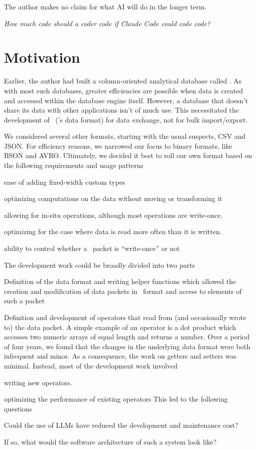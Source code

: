 \documentclass[letterpaper,12pt]{article}
\begin{document}
{The author makes no claim for what AI will do in the longer term.

\begin{center}
{\em How much code should a coder code if Claude Code could code code?}
\end{center}

\section{Motivation}

Earlier, 
the author had built a column-oriented analytical database called \Q. 
As with most such databases, greater efficiencies are possible
when data is created and accessed within the database
engine itself. 
However, a database that doesn't share its data with other applications isn't of
much use. This necessitated the development of \QDF\ (\Q's data format) for data
exchange, not for bulk import/export.

We considered several other formats, starting with the usual suspects,
 CSV and JSON. For efficiency reasons, we narrowed our focus to binary formats, like BSON
 and AVRO. Ultimately, we decided it best to roll our own format based on the
 following requirements and usage patterns
 \be
 \item ease of adding fixed-width custom types
 \item optimizing computations on the data without moving or
   transforming it
 \item allowing for in-situ operations,
   although most operations are write-once.
 \item optimizing for the case where data is read more 
   often than it is written. 
 \item ability to control whether a \QDF\ packet is ``write-once'' or not
   \ee

The development work could be broadly divided into two parts
\be
\item Definition of the data format and writing helper functions which allowed
  the creation and modification of data packets in \QDF\ format and access to
  elements of such a packet
\item Definition and development of operators that read from (and occasionally
  wrote to) the data packet.
  A simple example of an operator is a dot product which
accesses two numeric arrays of equal length and returns a number. 
  \ee
Over a period of four years, we found that the changes in
the underlying data format were both infrequent and minor.
As a consequence, the work on getters and setters was minimal. 
Instead, most of the development work involved
\be
\item writing new operators. 
\item optimizing the performance of existing operators 
  \ee
This led to the following questions
\be
\item Could the use of LLMs have reduced the development and maintenance cost?
\item If so, what would the software architecture of such a system look like?
  \ee

}
\end{document}
